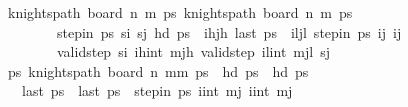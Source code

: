 \begin{isabellebody}
\ \ \ {\isachardoublequoteopen}knights{\isacharunderscore}{\kern0pt}path\ {\isacharparenleft}{\kern0pt}board\ n\ m\ ps\ {\isachardoublequoteopen}knights{\isacharunderscore}{\kern0pt}path\ {\isacharparenleft}{\kern0pt}board\ n\ m\ ps\ \isanewline
\ \ \ \ \ \ \ \ \ \ {\isachardoublequoteopen}step{\isacharunderscore}{\kern0pt}in\ ps\ s\isactrlsub i\ s\isactrlsub j{\isachardoublequoteclose}\ {\isachardoublequoteopen}hd\ ps\ {\isacharequal}{\kern0pt}\ {\isacharparenleft}{\kern0pt}i\isactrlsub h{\isacharcomma}{\kern0pt}j\isactrlsub h{\isacharparenright}{\kern0pt}{\isachardoublequoteclose}\ {\isachardoublequoteopen}last\ ps\ {\isacharequal}{\kern0pt}\ {\isacharparenleft}{\kern0pt}i\isactrlsub l{\isacharcomma}{\kern0pt}j\isactrlsub l{\isacharparenright}{\kern0pt}{\isachardoublequoteclose}\ {\isachardoublequoteopen}step{\isacharunderscore}{\kern0pt}in\ ps\ {\isacharparenleft}{\kern0pt}i{\isacharcomma}{\kern0pt}j{\isacharparenright}{\kern0pt}\ {\isacharparenleft}{\kern0pt}i{\isacharprime}{\kern0pt}{\isacharcomma}{\kern0pt}j{\isacharprime}{\kern0pt}{\isacharparenright}{\kern0pt}{\isachardoublequoteclose}\isanewline
\ \ \ \ \ \ \ \ \ \ {\isachardoublequoteopen}valid{\isacharunderscore}{\kern0pt}step\ s\isactrlsub i\ {\isacharparenleft}{\kern0pt}i\isactrlsub h{\isacharcomma}{\kern0pt}int\ mj\isactrlsub h{\isacharparenright}{\kern0pt}{\isachardoublequoteclose}\ {\isachardoublequoteopen}valid{\isacharunderscore}{\kern0pt}step\ {\isacharparenleft}{\kern0pt}i\isactrlsub l{\isacharcomma}{\kern0pt}int\ mj\isactrlsub l{\isacharparenright}{\kern0pt}\ s\isactrlsub j{\isachardoublequoteclose}\isanewline
\ \ \ {\isachardoublequoteopen}{\isasymexists}ps{\isachardot}{\kern0pt}\ knights{\isacharunderscore}{\kern0pt}path\ {\isacharparenleft}{\kern0pt}board\ n\ {\isacharparenleft}{\kern0pt}mm\ ps\ {\isasymand}\ hd\ ps\ {\isacharequal}{\kern0pt}\ hd\ ps\ \ \isanewline
\ \ \ \ {\isasymand}\ last\ ps\ {\isacharequal}{\kern0pt}\ last\ ps\ {\isasymand}\ step{\isacharunderscore}{\kern0pt}in\ ps\ {\isacharparenleft}{\kern0pt}i{\isacharcomma}{\kern0pt}int\ mj{\isacharparenright}{\kern0pt}\ {\isacharparenleft}{\kern0pt}i{\isacharprime}{\kern0pt}{\isacharcomma}{\kern0pt}int\ mj{\isacharprime}{\kern0pt}{\isacharparenright}{\kern0pt}{\isachardoublequoteclose}\isanewline

\end{isabellebody}
